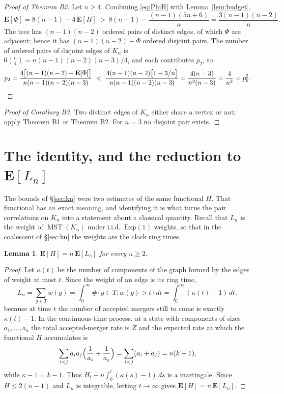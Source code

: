 \documentclass[11pt,a4paper]{amsart}
\theoremstyle{plain}
\newtheorem{lemma}[theorem]{Lemma}
\theoremstyle{definition}
\theoremstyle{remark}
\newcommand{\MST}{\operatorname{MST}}
\newcommand{\E}{\mathbf{E}}
\begin{document}
\begin{proof}[Proof of Theorem B2]
Let $n\ge4$. Combining \eqref{eq:PhiH} with Lemma~\ref{lem:budget},
\begin{equation}
\label{eq:Philower}
\E[\Phi]=8(n-1)-4\,\E[H]\ >\ 8(n-1)-\frac{(n-1)(5n+6)}n=\frac{3(n-1)(n-2)}n .
\end{equation}
The tree has $(n-1)(n-2)$ ordered pairs of distinct edges, of which $\Phi$ are
adjacent; hence it has $(n-1)(n-2)-\Phi$ ordered disjoint pairs. The number of
ordered pairs of disjoint edges of $K_n$ is
$6\binom n4=n(n-1)(n-2)(n-3)/4$, and each contributes $p_2$, so
\[
p_2=\frac{4\bigl[(n-1)(n-2)-\E[\Phi]\bigr]}{n(n-1)(n-2)(n-3)}
\ <\ \frac{4(n-1)(n-2)\bigl[1-3/n\bigr]}{n(n-1)(n-2)(n-3)}
=\frac{4(n-3)}{n^2(n-3)}=\frac4{n^2}=p_0^2 . \qedhere
\]
\end{proof}

\begin{proof}[Proof of Corollary B3]
Two distinct edges of $K_n$ either share a vertex or not; apply Theorem B1 or
Theorem B2. For $n=3$ no disjoint pair exists.
\end{proof}

\section{The identity, and the reduction to \texorpdfstring{$\E[L_n]$}{E[Ln]}}
\label{sec:identity}

The bounds of \S\ref{sec:kn} were two estimates of the same functional $H$. That
functional has an exact meaning, and identifying it is what turns the pair
correlations on $K_n$ into a statement about a classical quantity. Recall that
$L_n$ is the weight of $\MST(K_n)$ under i.i.d.\ $\mathrm{Exp}(1)$ weights, so
that in the coalescent of \S\ref{sec:kn} the weights are the clock ring times.

\begin{lemma}
\label{lem:HeqnL}
$\E[H]=n\,\E[L_n]$ for every $n\ge2$.
\end{lemma}

\begin{proof}
Let $\kappa(t)$ be the number of components of the graph formed by the edges of
weight at most $t$. Since the weight of an edge is its ring time,
\[
L_n=\sum_{g\in T}w(g)=\int_0^\infty\#\{g\in T:w(g)>t\}\,dt
=\int_0^\infty(\kappa(t)-1)\,dt ,
\]
because at time $t$ the number of accepted mergers still to come is exactly
$\kappa(t)-1$. In the continuous-time process, at
a state with components of sizes $a_1,\dots,a_k$ the total accepted-merger rate
is $Z$ and the expected rate at which the functional $H$ accumulates is
\[
\sum_{i<j}a_ia_j\Bigl(\frac1{a_i}+\frac1{a_j}\Bigr)=\sum_{i<j}(a_i+a_j)=n(k-1),
\]
while $\kappa-1=k-1$. Thus $H_t-n\int_0^t(\kappa(s)-1)\,ds$ is a martingale.
Since $H\le2(n-1)$ and $L_n$ is integrable, letting $t\to\infty$ gives
$\E[H]=n\,\E[L_n]$.
\end{proof}
\end{document}

